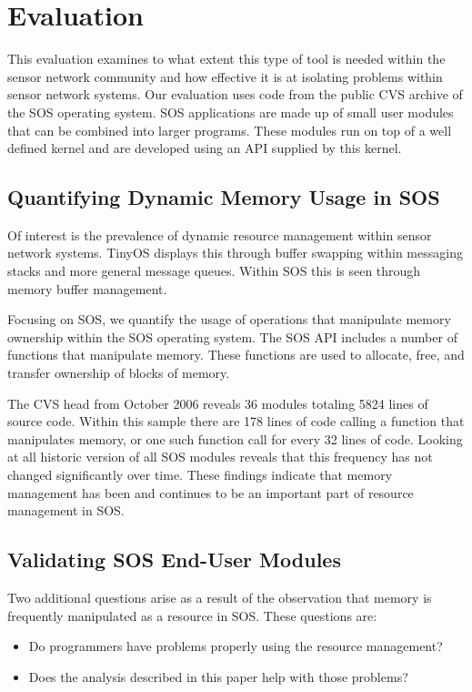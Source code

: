 \section{Evaluation}
\label{sec:eval}

This evaluation examines to what extent this type of tool is needed
within the sensor network community and how effective it is at
isolating problems within sensor network systems.  Our evaluation
uses code from the public CVS archive of the SOS operating system.
SOS applications are made up of small
user modules that can be combined into larger programs.  These modules
run on top of a well defined kernel and are developed using an API
supplied by this kernel.


\subsection{Quantifying Dynamic Memory Usage in SOS}

Of interest is the prevalence of dynamic resource management within
sensor network systems.  TinyOS displays this through buffer swapping
within messaging stacks and more general message queues.  Within SOS
this is seen through memory buffer management.  

Focusing on SOS, we quantify the usage of operations that manipulate
memory ownership within the SOS operating system.  The SOS API
includes a number of functions that manipulate memory.  These
functions are used to allocate, free, and transfer ownership of blocks
of memory.  

The CVS head from October 2006 reveals 36 modules totaling 5824 lines
of source code.  Within this sample there are 178 lines of code
calling a function that manipulates memory, or one such function call
for every 32 lines of code.  Looking at all historic version of all
SOS modules reveals that this frequency has not changed significantly
over time.  These findings indicate that memory management has been
and continues to be an important part of resource management in SOS.


\subsection{Validating SOS End-User Modules}

Two additional questions arise as a result of the observation that
memory is frequently manipulated as a resource in SOS.  These
questions are:
%
\begin{itemize}
%
\item Do programmers have problems properly using the resource
management?
%
\item Does the analysis described in this paper help with
those problems?
%
\end{itemize}

